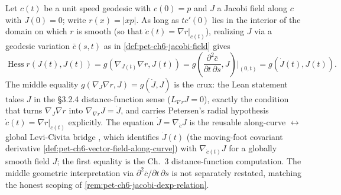 \begin{remark}
  \label{rem:pet-ch6-jacobi-hessian-r}
  \leanok
  Let $c(t)$ be a unit speed geodesic with $c(0)=p$ and $J$ a Jacobi field
  along $c$ with $J(0)=0$; write $r(x)=|xp|$. As long as $tc'(0)$ lies in the
  interior of the domain on which $r$ is smooth (so that $\dot c(t)=\nabla
  r|_{c(t)}$), realizing $J$ via a geodesic variation $\bar c(s,t)$ as in
  \cref{def:pet-ch6-jacobi-field} gives
  \[
    \operatorname{Hess}r(J(t),J(t))=g(\nabla_{J(t)}\nabla r,J(t))
    =g\!\left(\frac{\partial^2\bar c}{\partial t\,\partial s},J\right)\Big|_{(0,t)}
    =g(\dot J(t),J(t)).
  \]
  The middle equality $g(\nabla_{J}\nabla r,J)=g(\dot J,J)$ is the crux: the
  Lean statement takes $J$ in the \S3.2.4 distance-function sense
  ($L_{\nabla r}J=0$), exactly the condition that turns
  $\nabla_{J}\nabla r$ into $\nabla_{\nabla r}J=\dot J$, and carries Petersen's
  radial hypothesis $\dot c(t)=\nabla r|_{c(t)}$ explicitly. The equation
  $\dot J=\nabla_{\dot c}J$ is the reusable along-curve $\leftrightarrow$ global
  Levi-Civita bridge , which
  identifies $\dot J(t)$ (the moving-foot covariant derivative
  \cref{def:pet-ch6-vector-field-along-curve}) with $\nabla_{\dot c(t)}J$ for a
  globally smooth field $J$; the first equality is the Ch.~3
  distance-function computation. The middle geometric interpretation via
  $\partial^2\bar c/\partial t\,\partial s$ is not separately restated, matching
  the honest scoping of \cref{rem:pet-ch6-jacobi-dexp-relation}.
\end{remark}

